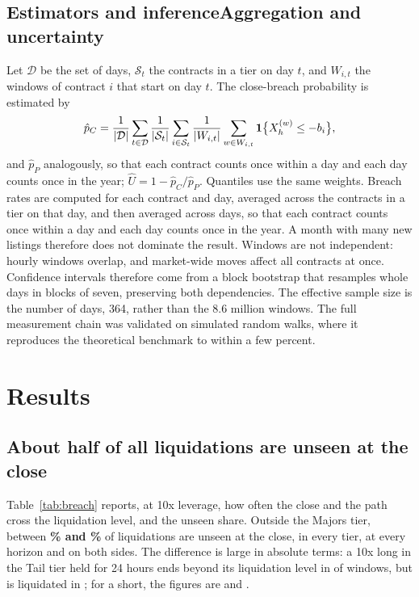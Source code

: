 \subsection{\iftechnical Estimators and inference\else Aggregation and uncertainty\fi}

\iftechnical
Let $\mathcal{D}$ be the set of days, $\mathcal{S}_t$ the contracts in a tier on day $t$, and
$W_{i,t}$ the windows of contract $i$ that start on day $t$. The close-breach probability is
estimated by
\begin{equation}
\hat p_C=\frac{1}{|\mathcal D|}\sum_{t\in\mathcal D}\frac{1}{|\mathcal S_t|}\sum_{i\in\mathcal S_t}
\frac{1}{|W_{i,t}|}\sum_{w\in W_{i,t}}\mathbf{1}\big\{X_h^{(w)}\le -b_i\big\},
\end{equation}
and $\hat p_P$ analogously, so that each contract counts once within a day and each day counts once in
the year; $\hat U=1-\hat p_C/\hat p_P$. Quantiles use the same weights.
\else
Breach rates are computed for each contract and day, averaged across the contracts in a tier on that
day, and then averaged across days, so that each contract counts once within a day and each day counts
once in the year. A month with many new listings therefore does not dominate the result.
\fi
Windows are not independent: hourly windows overlap, and market-wide moves affect all contracts at
once. Confidence intervals therefore come from a block bootstrap that resamples whole days in blocks
of seven, preserving both dependencies. The effective sample size is the number of days, 364, rather
than the 8.6 million windows. The full measurement chain was validated on simulated random walks,
where it reproduces the theoretical benchmark to within a few percent.

\section{Results}
\label{sec:results}

\subsection{About half of all liquidations are unseen at the close}

Table~\ref{tab:breach} reports, at 10x leverage, how often the close and the path cross the
liquidation level, and the unseen share. Outside the Majors tier, between
\textbf{\UTenLo\% and \UTenHi\%} of liquidations are unseen at the close, in every tier, at every
horizon and on both sides. The difference is large in absolute terms: a 10x long in the Tail tier
held for 24 hours ends beyond its liquidation level in \TailDayLongPC{} of windows, but is liquidated
in \TailDayLongPP; for a short, the figures are \TailDayShortPC{} and \TailDayShortPP.

